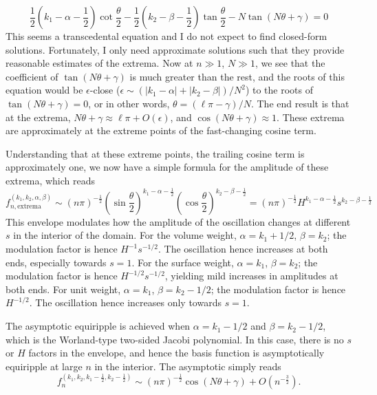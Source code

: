 %
\[
    \frac{1}{2} \left(k_1 - \alpha - \frac{1}{2}\right) \cot\frac{\theta}{2} - \frac{1}{2} \left(k_2 - \beta - \frac{1}{2}\right) \tan \frac{\theta}{2} - N \tan \left(N\theta + \gamma\right) = 0
\]
%
This seems a transcedental equation and I do not expect to find closed-form solutions. Fortunately, I only need approximate solutions such that they provide reasonable estimates of the extrema.
Now at $n\gg 1$, $N \gg 1$, we see that the coefficient of $\tan(N\theta + \gamma)$ is much greater than the rest, and the roots of this equation would be $\epsilon$-close ($\epsilon \sim (|k_1 - \alpha| + |k_2 - \beta|)/N^2$) to the roots of $\tan(N\theta + \gamma) = 0$, or in other words, $\theta = (\ell \pi - \gamma)/N$.
The end result is that at the extrema, $N\theta + \gamma \approx \ell \pi + O(\epsilon)$, and $\cos(N\theta + \gamma) \approx 1$. These extrema are approximately at the extreme points of the fast-changing cosine term.

Understanding that at these extreme points, the trailing cosine term is approximately one, we now have a simple formula for the amplitude of these extrema, which reads
%
\begin{equation}
    f_{n,\mathrm{extrema}}^{(k_1, k_2, \alpha, \beta)} \sim (n\pi)^{-\frac{1}{2}} (\sin \frac{\theta}{2})^{k_1 -\alpha - \frac{1}{2}} (\cos \frac{\theta}{2})^{k_2 -\beta - \frac{1}{2}} = (n\pi)^{-\frac{1}{2}} H^{k_1 -\alpha - \frac{1}{2}} s^{k_2 -\beta - \frac{1}{2}}
\end{equation}
%
This envelope modulates how the amplitude of the oscillation changes at different $s$ in the interior of the domain. For the volume weight, $\alpha = k_1 + 1/2$, $\beta = k_2$; the modulation factor is hence $H^{-1} s^{-1/2}$. The oscillation hence increases at both ends, especially towards $s=1$. For the surface weight, $\alpha = k_1$, $\beta = k_2$; the modulation factor is hence $H^{-1/2} s^{-1/2}$, yielding mild increases in amplitudes at both ends. For unit weight, $\alpha = k_1$, $\beta = k_2 - 1/2$; the modulation factor is hence $H^{-1/2}$. The oscillation hence increases only towards $s=1$.

The asymptotic equiripple is achieved when $\alpha = k_1 - 1/2$ and $\beta = k_2 - 1/2$, which is the Worland-type two-sided Jacobi polynomial. In this case, there is no $s$ or $H$ factors in the envelope, and hence the basis function is asymptotically equiripple at large $n$ in the interior. The asymptotic simply reads
%
\begin{equation}
    f_n^{(k_1, k_2, k_1 - \frac{1}{2}, k_2 - \frac{1}{2})} \sim (n\pi)^{-\frac{1}{2}} \cos(N\theta + \gamma) + O\left(n^{-\frac{3}{2}}\right).
\end{equation}
%


